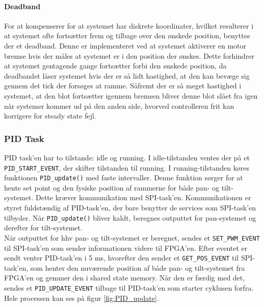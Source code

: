 \paragraph{Deadband}

For at kompenserer for at systemet har diskrete koordinater, hvilket resulterer i at systemet ofte fortsætter frem og tilbage over den ønskede position, benyttes der et deadband. Denne er implementeret ved at systemet aktiverer en motor bremse hvis der måles at systemet er i den position der ønskes. Dette forhindrer at systemet gentagende gange fortsætter forbi den ønskede position, da deadbandet låser systemet hvis der er så lidt hastighed, at den kan bevæge sig gennem det tick der forsøges at ramme. Såfremt der er så meget hastighed i systemet, at den blot fortsætter igennem bremsen bliver denne blot slået fra igen når systemer kommer ud på den anden side, hvorved controlleren frit kan korrigere for steady state fejl.

\subsubsection{PID Task}

PID task'en har to tilstande: idle og running. I idle-tilstanden ventes der på et \texttt{PID\_START\_EVENT}, der skifter tilstanden til running. I running-tilstanden køres funktionen \texttt{PID\_update()} med faste intervaller. Denne funktion sørger for at hente set point og den fysiske position af rammerne for både pan- og tilt-systemet. Dette kræver kommunikation med SPI-task'en. Kommunikationen er styret fuldstændig af PID-task'en, der bare benytter de services som SPI-task'en tilbyder. Når \texttt{PID\_update()} bliver kaldt, beregnes outputtet for pan-systemet og derefter for tilt-systemet.\\
Når outputtet for hhv pan- og tilt-systemet er beregnet, sendes et \texttt{SET\_PWM\_EVENT} til SPI-task'en som sender informationen videre til FPGA'en. Efter eventet er sendt venter PID-task'en i 5 ms, hvorefter den sender et \texttt{GET\_POS\_EVENT} til SPI-task'en, som henter den nuværende position af både pan- og tilt-systemet fra FPGA'en og gemmer den i shared state memory. Når den er færdig med det, sendes et \texttt{PID\_UPDATE\_EVENT} tilbage til PID-task'en som starter cyklusen forfra. Hele processen kan ses på figur \ref{fig:PID_update}.

